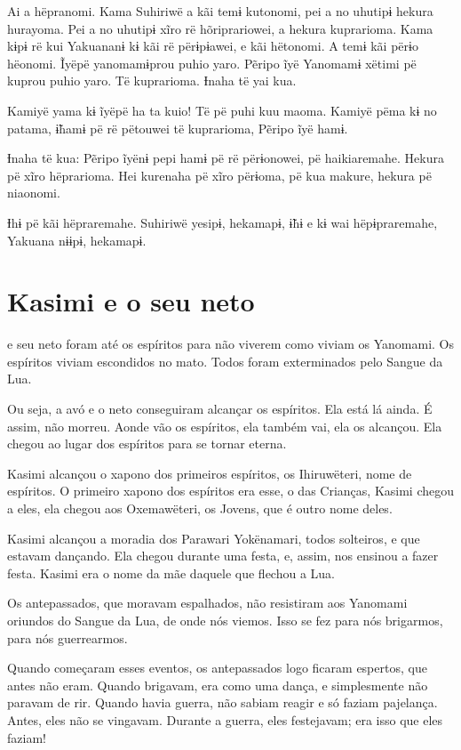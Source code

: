 Ai a hëpranomi. Kama Suhiriwë a kãi temɨ kutonomi, pei a no uhutipɨ
hekura hurayoma. Pei a no uhutipɨ xĩro rë hõriprariowei, a hekura
kuprarioma. Kama kɨpɨ rë kui Yakuananɨ kɨ kãi rë përɨpɨawei, e kãi
hëtonomi. A temɨ kãi përɨo hëonomi. Ĩyëpë yanomamɨprou puhio yaro.
Pẽripo ĩyë Yanomamɨ xëtimi pë kuprou puhio yaro. Të kuprarioma. Ɨnaha të
yai kua.

Kamiyë yama kɨ ĩyëpë ha ta kuio! Të pë puhi kuu maoma. Kamiyë pëma kɨ no
patama, ɨ̃hamɨ pë rë pëtouwei të kuprarioma, Pẽripo ĩyë hamɨ. 

Ɨnaha të kua: Pẽripo ĩyënɨ pepi hamɨ pë rë përɨonowei, pë haikiaremahe.
Hekura pë xĩro hëprarioma. Hei kurenaha pë xĩro përɨoma, pë kua makure,
hekura pë niaonomi. 

Ɨhɨ pë kãi hëpraremahe. Suhiriwë yesipɨ, hekamapɨ, ɨ̃hɨ e kɨ wai
hëpɨpraremahe, Yakuana nɨɨpɨ, hekamapɨ.

\chapter{Kasimi e o seu neto}

 e seu neto foram até os espíritos para não viverem como viviam
os Yanomami. Os espíritos viviam escondidos no mato. Todos foram
exterminados pelo Sangue da Lua.

Ou seja, a avó e o neto conseguiram alcançar os espíritos. Ela está lá ainda. É assim, não morreu. Aonde vão os espíritos, ela também vai, ela os
alcançou. Ela chegou ao lugar dos espíritos para se tornar eterna. 

Kasimi alcançou o xapono dos primeiros espíritos, os Ihiruwëteri, nome
de espíritos. O primeiro xapono dos espíritos era esse, o das
Crianças, Kasimi chegou a eles, ela chegou aos
Oxemawëteri, os Jovens, que é outro nome deles. 

Kasimi alcançou a moradia dos Parawari Yokënamari, todos solteiros, e que
estavam dançando. Ela chegou durante uma festa, e, assim, nos ensinou a
fazer festa. Kasimi era o nome da mãe daquele que flechou a Lua.

Os antepassados, que moravam espalhados, não resistiram aos Yanomami
oriundos do Sangue da Lua, de onde nós viemos. Isso se fez para nós
brigarmos, para nós guerrearmos. 

Quando começaram esses eventos, os antepassados logo ficaram espertos,
que antes não eram. Quando brigavam, era como uma dança, e
simplesmente não paravam de rir. Quando havia guerra, não sabiam reagir
e {só} faziam pajelança. Antes, eles não se vingavam.
Durante a guerra, eles festejavam; era isso que eles faziam! 

